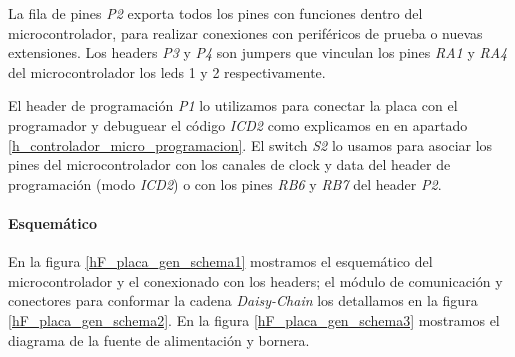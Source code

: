 La fila de pines \emph{P2} exporta todos los pines con funciones dentro del microcontrolador, para realizar
conexiones con perif\'ericos de prueba o nuevas extensiones.
Los headers \emph{P3} y \emph{P4} son jumpers que vinculan los pines \emph{RA1} y \emph{RA4} del
microcontrolador los leds 1 y 2 respectivamente.

El header de programaci\'on \emph{P1} lo utilizamos para conectar la placa con el programador y debuguear
el c\'odigo \emph{ICD2} como explicamos en en apartado \ref{h_controlador_micro_programacion}.
El switch \emph{S2} lo usamos para asociar los pines del microcontrolador con los canales de clock
y data del header de programaci\'on (modo \emph{ICD2}) o con los pines \emph{RB6} y \emph{RB7 }del header
\emph{P2}.

\paragraph{Esquem\'atico}
\label{h_placas_generica_esquematicos}

En la figura \ref{hF_placa_gen_schema1} mostramos el esquem\'atico del microcontrolador y el conexionado
con los headers; el m\'odulo de comunicaci\'on y conectores para conformar la cadena \emph{Daisy-Chain}
los detallamos en la figura \ref{hF_placa_gen_schema2}.
En la figura \ref{hF_placa_gen_schema3} mostramos el diagrama de la fuente de alimentaci\'on y bornera.

